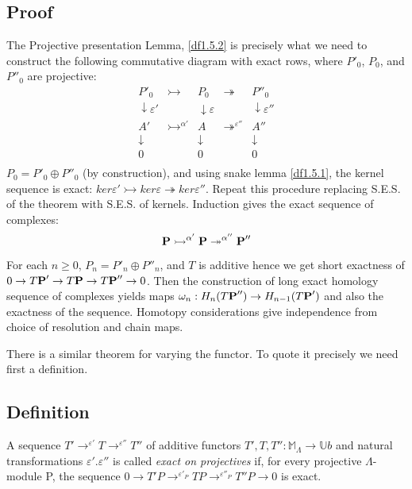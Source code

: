 \subsection*{Proof}

The Projective presentation Lemma, \ref{df1.5.2} is precisely what
we need to construct the following commutative diagram with exact
rows, where $P'_0$, $P_0$, and $P''_0$ are projective:
$$\begin{array}{ccccc}
  P'_0 & \rightarrowtail & P_0 & \twoheadrightarrow & P''_0 \\
  \downarrow \varepsilon' &  & \downarrow \varepsilon &  & \downarrow \varepsilon'' \\
  A' & \rightarrowtail ^{\alpha'} & A & \twoheadrightarrow^{\varepsilon''} & A'' \\
  \downarrow &  & \downarrow &  & \downarrow \\
  0 &  & 0 &  & 0 \\
\end{array}$$
$P_0 = P'_0 \oplus P''_0$ (by construction), and using snake lemma
\ref{df1.5.1}, the kernel sequence is exact: $ker \varepsilon'
\rightarrowtail ker \varepsilon \twoheadrightarrow ker
\varepsilon''$. Repeat this procedure replacing S.E.S. of the
theorem with S.E.S. of kernels. Induction gives the exact sequence
of complexes:
$$\textbf P \rightarrowtail^{\alpha'} \textbf P \twoheadrightarrow
^{\alpha''} \textbf P''$$

For each $n\geq 0$, $P_n = P'_n \oplus P''_n$, and $T$ is additive
hence we get short exactness of $0\rightarrow T\textbf P'
\rightarrow T\textbf P \rightarrow T\textbf P'' \rightarrow 0$.
Then the construction of long exact homology sequence of complexes
yields maps $\omega_n : H_n(T\textbf P'')\rightarrow H_{n-1}
(T\textbf P')$ and also the exactness of the sequence. Homotopy
considerations give independence from choice of resolution and
chain maps.


There is a similar theorem for varying the functor. To quote it
precisely we need first a definition.

\subsection{Definition}\label{df1.5.4}
A sequence $T'\rightarrow^{\varepsilon'}
T\rightarrow^{\varepsilon''} T''$ of additive functors
$T',T,T'':\mathbb M_\Lambda \rightarrow \mathbb Ub$ and natural
transformations $\varepsilon'. \varepsilon''$ is called
\textit{exact on projectives} if, for every projective
$\Lambda$-module P, the sequence $0\rightarrow
T'P\rightarrow^{\varepsilon'_P}
TP\rightarrow^{\varepsilon''_P}T''P\rightarrow 0$ is exact.



